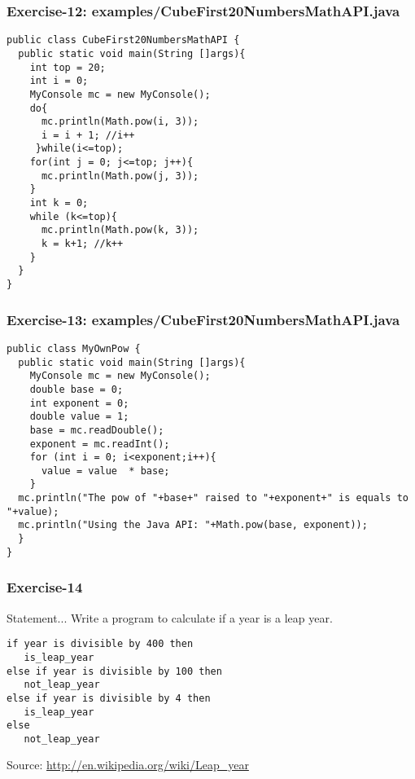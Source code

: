 \documentclass[xcolor=dvipsnames,dvip,notes=show,table]{beamer}
\begin{document}


\begin{frame}[fragile]
\frametitle{Exercise-12: examples/CubeFirst20NumbersMathAPI.java}
\tiny
\begin{lstlisting}
public class CubeFirst20NumbersMathAPI {
  public static void main(String []args){
    int top = 20;
    int i = 0;
    MyConsole mc = new MyConsole();
    do{
      mc.println(Math.pow(i, 3));
      i = i + 1; //i++
     }while(i<=top);
    for(int j = 0; j<=top; j++){
      mc.println(Math.pow(j, 3));
    }
    int k = 0;
    while (k<=top){
      mc.println(Math.pow(k, 3));
      k = k+1; //k++
    }
  }
}
\end{lstlisting}
\end{frame}





\begin{frame}[fragile]
\frametitle{Exercise-13: examples/CubeFirst20NumbersMathAPI.java}
\tiny
\begin{lstlisting}
public class MyOwnPow {
  public static void main(String []args){
    MyConsole mc = new MyConsole();
    double base = 0;
    int exponent = 0;
    double value = 1;
    base = mc.readDouble();
    exponent = mc.readInt();
    for (int i = 0; i<exponent;i++){
      value = value  * base; 
    }
  mc.println("The pow of "+base+" raised to "+exponent+" is equals to "+value);
  mc.println("Using the Java API: "+Math.pow(base, exponent));
  }
}
\end{lstlisting}
\end{frame}



\begin{frame}[fragile]
\frametitle{Exercise-14}
\begin{block}{Statement...}
 Write a program to calculate if a year is a leap year.
\end{block}
\begin{lstlisting}
if year is divisible by 400 then
   is_leap_year
else if year is divisible by 100 then
   not_leap_year
else if year is divisible by 4 then
   is_leap_year
else
   not_leap_year
\end{lstlisting}

Source: \url{http://en.wikipedia.org/wiki/Leap\_year}
\end{frame}
\end{document}
